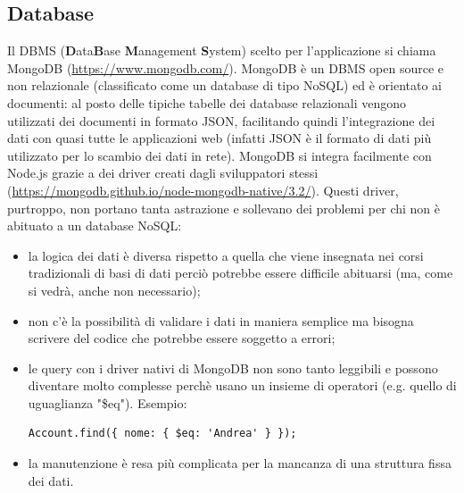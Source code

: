 \documentclass[12pt]{report}
\begin{document}
\subsection{Database}\label{sec:db}
%
Il DBMS (\textbf{D}ata\textbf{B}ase \textbf{M}anagement \textbf{S}ystem) scelto per l'applicazione si chiama MongoDB (\url{https://www.mongodb.com/}). MongoDB è un DBMS open source e non relazionale (classificato come un database di tipo NoSQL) ed è orientato ai documenti: al posto delle tipiche tabelle dei database relazionali vengono utilizzati dei documenti in formato JSON, facilitando quindi l'integrazione dei dati con quasi tutte le applicazioni web (infatti JSON è il formato di dati più utilizzato per lo scambio dei dati in rete).
MongoDB si integra facilmente con Node.js grazie a dei driver creati dagli sviluppatori stessi (\url{https://mongodb.github.io/node-mongodb-native/3.2/}). Questi driver, purtroppo, non portano tanta astrazione e sollevano dei problemi per chi non è abituato a un database NoSQL: 
\begin{itemize}
	\item la logica dei dati è diversa rispetto a quella che viene insegnata nei corsi tradizionali di basi di dati perciò potrebbe essere difficile abituarsi (ma, come si vedrà, anche non necessario);
	\item non c'è la possibilità di validare i dati in maniera semplice ma bisogna scrivere del codice che potrebbe essere soggetto a errori;
	\item le query con i driver nativi di MongoDB non sono tanto leggibili e possono diventare molto complesse perchè usano un insieme di operatori (e.g. quello di uguaglianza "\$eq"). Esempio:
\begin{lstlisting}
Account.find({ nome: { $eq: 'Andrea' } });
\end{lstlisting}
	\item la manutenzione è resa più complicata per la mancanza di una struttura fissa dei dati.
\end{itemize}
\end{document}
